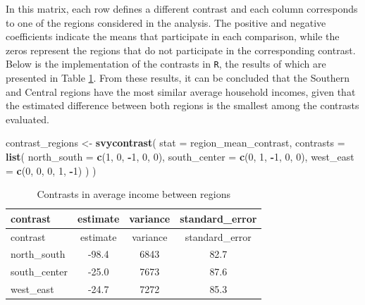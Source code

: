 \documentclass[
  english,
  12pt,
]{book}
\newenvironment{Shaded}{\begin{snugshade}}{\end{snugshade}}
\newcommand{\AttributeTok}[1]{\textcolor[rgb]{0.13,0.29,0.53}{#1}}
\newcommand{\DecValTok}[1]{\textcolor[rgb]{0.00,0.00,0.81}{#1}}
\newcommand{\FunctionTok}[1]{\textcolor[rgb]{0.13,0.29,0.53}{\textbf{#1}}}
\newcommand{\NormalTok}[1]{#1}
\newcommand{\OtherTok}[1]{\textcolor[rgb]{0.56,0.35,0.01}{#1}}
\newcommand{\SpecialCharTok}[1]{\textcolor[rgb]{0.81,0.36,0.00}{\textbf{#1}}}
\begin{document}
In this matrix, each row defines a different contrast and each column corresponds to one of the regions considered in the analysis. The positive and negative coefficients indicate the means that participate in each comparison, while the zeros represent the regions that do not participate in the corresponding contrast. Below is the implementation of the contrasts in \texttt{R}, the results of which are presented in Table \ref{tab:tab-contraste-regiones}. From these results, it can be concluded that the Southern and Central regions have the most similar average household incomes, given that the estimated difference between both regions is the smallest among the contrasts evaluated.

\begin{Shaded}
\begin{Highlighting}[]
\NormalTok{contrast\_regions }\OtherTok{\textless{}{-}} \FunctionTok{svycontrast}\NormalTok{(}
  \AttributeTok{stat =}\NormalTok{ region\_mean\_contrast,}
  \AttributeTok{contrasts =} \FunctionTok{list}\NormalTok{(}
    \AttributeTok{north\_south =} \FunctionTok{c}\NormalTok{(}\DecValTok{1}\NormalTok{, }\DecValTok{0}\NormalTok{, }\SpecialCharTok{{-}}\DecValTok{1}\NormalTok{, }\DecValTok{0}\NormalTok{, }\DecValTok{0}\NormalTok{),}
    \AttributeTok{south\_center =} \FunctionTok{c}\NormalTok{(}\DecValTok{0}\NormalTok{, }\DecValTok{1}\NormalTok{, }\SpecialCharTok{{-}}\DecValTok{1}\NormalTok{, }\DecValTok{0}\NormalTok{, }\DecValTok{0}\NormalTok{),}
    \AttributeTok{west\_east =} \FunctionTok{c}\NormalTok{(}\DecValTok{0}\NormalTok{, }\DecValTok{0}\NormalTok{, }\DecValTok{0}\NormalTok{, }\DecValTok{1}\NormalTok{, }\SpecialCharTok{{-}}\DecValTok{1}\NormalTok{)}
\NormalTok{  )}
\NormalTok{)}
\end{Highlighting}
\end{Shaded}

\begin{longtable}[]{@{}lccc@{}}
\caption{\label{tab:tab-contraste-regiones}Contrasts in average income between regions}\tabularnewline
\toprule\noalign{}
contrast & estimate & variance & standard\_error \\
\midrule\noalign{}
\endfirsthead
\toprule\noalign{}
contrast & estimate & variance & standard\_error \\
\midrule\noalign{}
\endhead
\bottomrule\noalign{}
\endlastfoot
north\_south & -98.4 & 6843 & 82.7 \\
south\_center & -25.0 & 7673 & 87.6 \\
west\_east & -24.7 & 7272 & 85.3 \\
\end{longtable}
\end{document}
